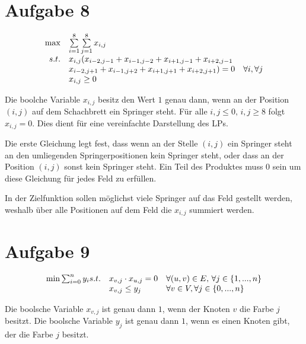 \documentclass[10pt]{article}
\begin{document}
\section*{Aufgabe 8}
  \begin{equation}
    \begin{array}{r l l}
      \max & \sum\limits_{i=1}^{8} \sum\limits_{j=1}^{8} x_{i,j}& \\
      s.t.& x_{i,j}(x_{i-2,j-1} + x_{i-1,j-2} + x_{i+1,j-1} + x_{i+2,j-1} & \\
          & x_{i-2,j+1} + x_{i-1,j+2} + x_{i+1,j+1} + x_{i+2,j+1})=0 & \forall i,
      \forall j \\
          & x_{i,j} \geq 0&
    \end{array}
  \end{equation}

  Die boolche Variable $x_{i,j}$ besitz den Wert $1$ genau dann,
  wenn an der Position $(i,j)$ auf dem Schachbrett ein Springer steht. Für alle
  $i,j\leq 0,\,i,j\geq 8$ folgt $x_{i,j}=0$. Dies dient für eine vereinfachte
  Darstellung des LPs.

  Die erste Gleichung legt fest, dass wenn an der Stelle $(i,j)$ ein Springer steht
  an den umliegenden Springerpositionen kein Springer steht, oder dass an der
  Position $(i,j)$ sonst kein Springer steht. Ein Teil des Produktes muss $0$
  sein um diese Gleichung für jedes Feld zu erfüllen.

  In der Zielfunktion sollen möglichst viele Springer auf das Feld gestellt
  werden, weshalb über alle Positionen auf dem Feld die $x_{i,j}$ summiert
  werden.


\section*{Aufgabe 9}
  \begin{equation}
    \begin{array}{r l l}
      \min \sum_{i=0}^{n} y_{i}
      s.t. & x_{v,j} \cdot x_{u,j} = 0 & \forall (u,v)\in E,\, \forall j\in
            \{1,...,n\} \\
            & x_{v,j} \leq y_{j} & \forall v\in V, \forall j\in \{0,...,n\}
    \end{array}
  \end{equation}

  Die boolsche Variable $x_{v,j}$ ist genau dann $1$, wenn der Knoten $v$ die
  Farbe $j$ besitzt.
  Die boolsche Variable $y_{j}$ ist genau dann $1$, wenn es einen Knoten gibt,
  der die Farbe $j$ besitzt.
\end{document}

